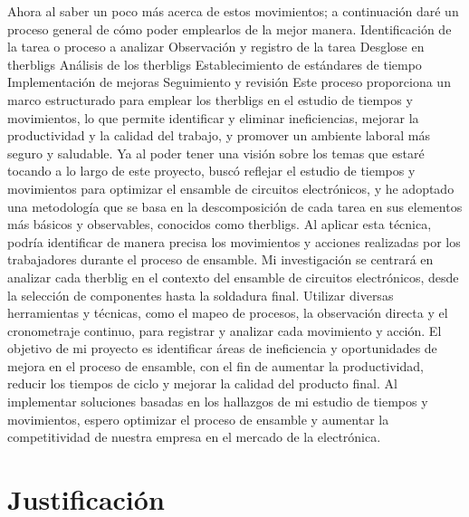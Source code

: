 \begin{itemize}
    Ahora al saber un poco más acerca de estos movimientos; a continuación daré un proceso general de cómo poder emplearlos de la mejor manera.
    Identificación de la tarea o proceso a analizar
    Observación y registro de la tarea 
    Desglose en therbligs
    Análisis de los therbligs
    Establecimiento de estándares de tiempo 
    Implementación de mejoras
    Seguimiento y revisión
    Este proceso proporciona un marco estructurado para emplear los therbligs en el estudio de tiempos y movimientos, lo que permite identificar y eliminar ineficiencias, mejorar la productividad y la calidad del trabajo, y promover un ambiente laboral más seguro y saludable.
    Ya al poder tener una visión sobre los temas que estaré tocando a lo largo de este proyecto, buscó reflejar el estudio de tiempos y movimientos para optimizar el ensamble de circuitos electrónicos, y he adoptado una metodología que se basa en la descomposición de cada tarea en sus elementos más básicos y observables, conocidos como therbligs. Al aplicar esta técnica, podría identificar de manera precisa los movimientos y acciones realizadas por los trabajadores durante el proceso de ensamble.
    Mi investigación se centrará en analizar cada therblig en el contexto del ensamble de circuitos electrónicos, desde la selección de componentes hasta la soldadura final. Utilizar diversas herramientas y técnicas, como el mapeo de procesos, la observación directa y el cronometraje continuo, para registrar y analizar cada movimiento y acción.
    El objetivo de mi proyecto es identificar áreas de ineficiencia y oportunidades de mejora en el proceso de ensamble, con el fin de aumentar la productividad, reducir los tiempos de ciclo y mejorar la calidad del producto final. Al implementar soluciones basadas en los hallazgos de mi estudio de tiempos y movimientos, espero optimizar el proceso de ensamble y aumentar la competitividad de nuestra empresa en el mercado de la electrónica.
    \end{itemize}
    \section{Justificación}
    
